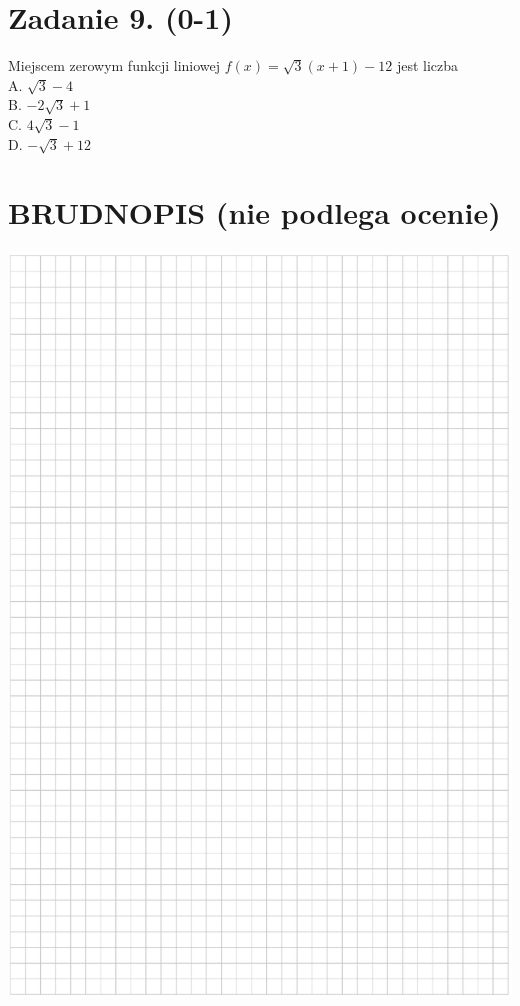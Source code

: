 \documentclass[10pt]{article}
\begin{document}
\section*{Zadanie 9. (0-1)}
Miejscem zerowym funkcji liniowej \(f(x)=\sqrt{3}(x+1)-12\) jest liczba\\
A. \(\sqrt{3}-4\)\\
B. \(-2 \sqrt{3}+1\)\\
C. \(4 \sqrt{3}-1\)\\
D. \(-\sqrt{3}+12\)

\section*{BRUDNOPIS (nie podlega ocenie)}
\begin{center}
\includegraphics[max width=\textwidth]{2024_11_21_7b5527312ea89ae66fd0g-05}
\end{center}
\end{document}
